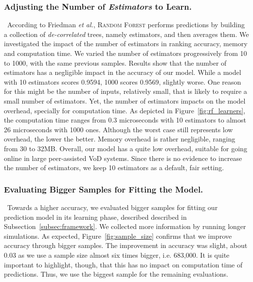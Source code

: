 \subsubsection{Adjusting the Number of \emph{Estimators} to Learn.}

\ According to Friedman \emph{et al.}, \textsc{Random Forest} performs predictions by building a collection of \emph{de-correlated} trees, namely estimators, and then averages them. We investigated the impact of the number of estimators in ranking accuracy, memory and computation time. We varied the number of estimators progressively from 10 to 1000, with the same previous samples. Results show that the number of estimators has a negligible impact in the accuracy of our model. While a model with 10 estimators scores 0.9594, 1000 scores 0.9569, slightly worse. One reason for this might be the number of inputs, relatively small, that is likely to require a small number of estimators. Yet, the number of estimators impacts on the model overhead, specially for computation time. As depicted in Figure~\ref{fig:rf_learners}, the computation time ranges from 0.3 microseconds with 10 estimators to almost 26 microseconds with 1000 ones. Although the worst case still represents low overhead, the lower the better. Memory overhead is rather negligible, ranging from 30 to 32MB. Overall, our model has a quite low overhead, suitable for going online in large peer-assisted VoD systems. Since there is no evidence to increase the number of estimators, we keep 10 estimators as a default, fair setting.

\subsubsection{Evaluating Bigger Samples for Fitting the Model.}

\ Towards a higher accuracy, we evaluated bigger samples for fitting our prediction model in its learning phase, described described in Subsection~\ref{subsec:framework}. We collected more information by running longer simulations. As expected, Figure~\ref{fig:sample_size} confirms that we improve accuracy through bigger samples. The improvement in accuracy was slight, about 0.03 as we use a sample size almost six times bigger, i.e. 683,000. It is quite important to highlight, though, that this has no impact on computation time of predictions. Thus, we use the biggest sample for the remaining evaluations.

